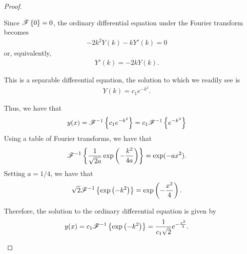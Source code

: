\begin{proof}
\begin{enumerate}
      Since $\mathscr{F}\left\{ {0} \right\} = 0$, the ordinary differential equation under the Fourier
      transform becomes
      \begin{align*}
        -2k^2Y(k) - kY'(k) = 0
      \end{align*}
      or, equivalently,
      \begin{align*}
        Y'(k) = -2kY(k).
      \end{align*}

      This is a separable differential equation, the solution to which we readily see is
      \begin{align*}
        Y(k) = c_1 e^{-k^2}.
      \end{align*}

      Thus, we have that
      \begin{align*}
        y(x) = \mathscr{F}^{-1}\left\{ {c_1 e^{-k^2}} \right\} = c_1 \mathscr{F}^{-1}\left\{ {e^{-k^2}} \right\}
      \end{align*}
      Using a table of Fourier transforms, we have that
      \begin{align*}
        \mathscr{F}^{-1}\left\{ { \frac{1}{\sqrt{2a}} \exp\left(-\frac{k^2}{4a}\right)} \right\} = \exp(-ax^2).
      \end{align*}
      Setting $a=1/4$, we have that
      \begin{align*}
        \sqrt{2}\mathscr{F}^{-1}\left\{ { \exp\left(-k^2\right)} \right\} = \exp\left(-\frac{x^2}{4}\right).
      \end{align*}

      Therefore, the solution to the ordinary differential equation is given by
      \begin{align*}
        y(x) = c_1 \mathscr{F}^{-1}\left\{ { \exp\left(-k^2\right)} \right\} = \frac{1}{c_1\sqrt{2}}e^{-\frac{x^2}{4}}.
      \end{align*}
  \end{enumerate}
\end{proof}
\newpage

